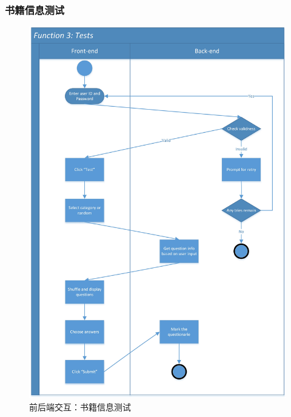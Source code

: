 \documentclass[twoside,11pt]{article}
\begin{document}
\subsubsection{书籍信息测试}
\begin{figure}[H]
    \centering
    \includegraphics[width=0.8\columnwidth]{SwimLaneDiagram/Usecase_3.jpg}
    \caption{前后端交互：书籍信息测试}
    \label{fig:test}
\end{figure}
\newpage
\end{document}
